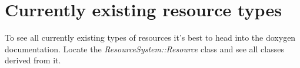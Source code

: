 \section{Currently existing resource types}
To see all currently existing types of resources it's best to head into the doxygen documentation. Locate the \emph{ResourceSystem::Resource} class and see all classes derived from it.


%


